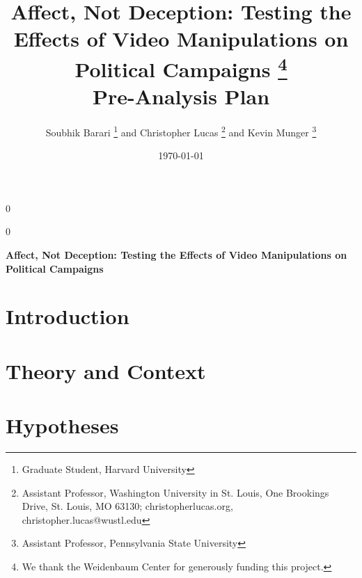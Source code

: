 \documentclass[12pt]{article}
\newcommand{\blind}{0}
\begin{document}
\def\spacingset#1{\renewcommand{\baselinestretch}%
{#1}\small\normalsize} \spacingset{1}


\date{\today}

\blind { \title{\bf Affect, Not Deception: Testing the Effects of Video Manipulations on Political Campaigns
    \thanks{We thank the Weidenbaum Center for generously funding this project.}
    \\\bigskip Pre-Analysis Plan
  }
  \author{Soubhik Barari
    \thanks{Graduate Student, Harvard University}
    and
    Christopher Lucas
    \thanks{Assistant Professor, Washington
      University in St. Louis, One Brookings Drive, St. Louis, MO
      63130; christopherlucas.org, christopher.lucas@wustl.edu}
    and
    Kevin Munger
    \thanks{Assistant Professor, Pennsylvania State University}
  }
  \maketitle } \fi

\blind
{
  \bigskip
  \bigskip
  \bigskip
  \begin{center}
    {\LARGE\bf Affect, Not Deception: Testing the Effects of Video Manipulations on Political Campaigns}
\end{center}
  \medskip
} \fi

\bigskip
\begin{abstract}

\end{abstract}

\vspace{1em}
\begin{center}
\end{center}

\newpage
\spacingset{2} 

\section{Introduction}


\section{Theory and Context}


\section{Hypotheses}

\end{document}
